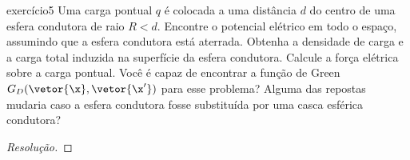 \begin{exercício}{}{exercício5}
    Uma carga pontual \(q\) é colocada a uma distância \(d\) do centro de uma esfera condutora de raio \(R < d\). Encontre o potencial elétrico em todo o espaço, assumindo que a esfera condutora está aterrada. Obtenha a densidade de carga e a carga total induzida na superfície da esfera condutora. Calcule a força elétrica sobre a carga pontual. Você é capaz de encontrar a função de Green \(G_D(\vetor{\x}, \vetor{\x'})\) para esse problema? Alguma das repostas mudaria caso a esfera condutora fosse substituída por uma casca esférica condutora?
\end{exercício}
\begin{proof}[Resolução]

\end{proof}
